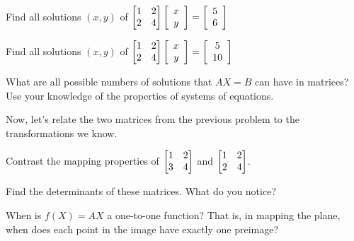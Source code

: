 \documentclass[../gatm_answers.tex]{subfiles}
\begin{document}
\begin{inner_problem}
\item \label{prob:needed_for_matrix_undo4}Find all solutions $(x,y)$ of $\begin{bmatrix} 1 & 2 \\ 2 & 4 \end{bmatrix}\left[\begin{array}{c} x \\ y \end{array}\right]=\left[\begin{array}{c} 5 \\ 6 \end{array}\right]$
\end{inner_problem}

\begin{inner_problem}
\item Find all solutions $(x,y)$ of $\begin{bmatrix} 1 & 2 \\ 2 & 4 \end{bmatrix}\left[\begin{array}{c} x \\ y \end{array}\right]=\left[\begin{array}{c} 5 \\ 10 \end{array}\right]$
\end{inner_problem}

\begin{inner_problem}
\item What are all possible numbers of solutions that $AX=B$ can have in matrices? Use your knowledge of the properties of systems of equations.
\end{inner_problem}

\begin{outer_problem}
\item Now, let's relate the two matrices from the previous problem to the transformations we know.
\end{outer_problem}

\begin{inner_problem}[start=1]
\item Contrast the mapping properties of $\begin{bmatrix} 1 & 2 \\ 3 & 4 \end{bmatrix}$ and $\begin{bmatrix} 1 & 2 \\ 2 & 4 \end{bmatrix}$.
\end{inner_problem}

\begin{inner_problem}
\item Find the determinants of these matrices. What do you notice?
\end{inner_problem}

\begin{inner_problem}
\item When is $f(X)=AX$ a one-to-one function? That is, in mapping the plane, when does each point in the image have exactly one preimage?
\end{inner_problem}
\end{document}

